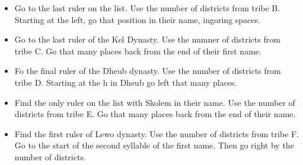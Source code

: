 \begin{itemize}
        \item Go to the last ruler on the list. Use the number of districts from tribe B. Starting at the left, go that position in their name, ingoring spaces.
        \item Go to the last ruler of the Kel Dynasty. Use the numner of districts from tribe C. Go that many places back from the end of their first name.
        \item Fo the final ruler of the Dheub dynasty. Use the number of districts from tribe D. Starting at the h in Dheub go left that many places.
        \item Find the only ruler on the list with Skolem in their name. Use the number of districts from tribe E. Go that many places back from the end of their name.
        \item Find the first ruler of Lewo dynasty. Use the number of districts from tribe F. Go to the start of the second syllable of the first name. Then go right by the number of districts.
\end{itemize}